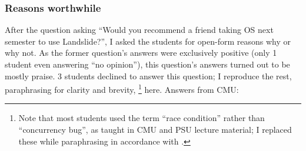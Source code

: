 \subsubsection{Reasons worthwhile}

After the question asking ``Would you recommend a friend taking OS next semester to use Landslide?'',
I asked the students for open-form reasons why or why not.
As the former question's answers were exclusively positive (only 1 student even answering ``no opinion''),
this question's answers turned out to be mostly praise.
3 students declined to answer this question;
I reproduce the rest, paraphrasing for clarity and brevity,%
\footnote{Note that most students used the term ``race condition'' rather than ``concurrency bug'',
as taught in CMU and PSU lecture material;
I replaced these while paraphrasing in accordance with \sect{\ref{sec:glossary}}.}
here.
Answers from CMU:

